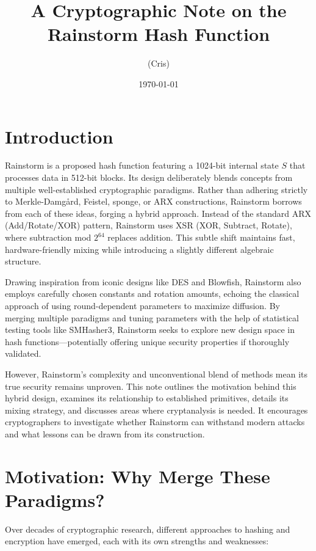 \documentclass[11pt,a4paper]{article}
\title{A Cryptographic Note on the Rainstorm Hash Function}
\author{(Cris)}
\date{\today}
\begin{document}
\maketitle

\section*{Introduction}
Rainstorm is a proposed hash function featuring a 1024-bit internal state \( S \) that processes data in 512-bit blocks. Its design deliberately blends concepts from multiple well-established cryptographic paradigms. Rather than adhering strictly to Merkle-Damg{\aa}rd, Feistel, sponge, or ARX constructions, Rainstorm borrows from each of these ideas, forging a hybrid approach. Instead of the standard ARX (Add/Rotate/XOR) pattern, Rainstorm uses XSR (XOR, Subtract, Rotate), where subtraction mod \(2^{64}\) replaces addition. This subtle shift maintains fast, hardware-friendly mixing while introducing a slightly different algebraic structure.

Drawing inspiration from iconic designs like DES and Blowfish, Rainstorm also employs carefully chosen constants and rotation amounts, echoing the classical approach of using round-dependent parameters to maximize diffusion. By merging multiple paradigms and tuning parameters with the help of statistical testing tools like SMHasher3, Rainstorm seeks to explore new design space in hash functions—potentially offering unique security properties if thoroughly validated.

However, Rainstorm’s complexity and unconventional blend of methods mean its true security remains unproven. This note outlines the motivation behind this hybrid design, examines its relationship to established primitives, details its mixing strategy, and discusses areas where cryptanalysis is needed. It encourages cryptographers to investigate whether Rainstorm can withstand modern attacks and what lessons can be drawn from its construction.

\section*{Motivation: Why Merge These Paradigms?}
Over decades of cryptographic research, different approaches to hashing and encryption have emerged, each with its own strengths and weaknesses:
\end{document}
